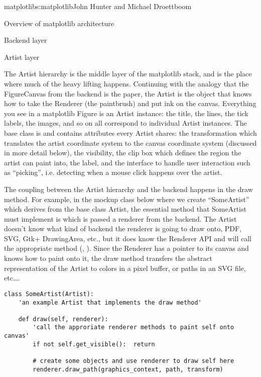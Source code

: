 \begin{aosachapter}{matplotlib}{s:matplotlib}{John Hunter and Michael Droettboom}
\begin{aosasect1}{Overview of matplotlib architecture}
\begin{aosasect2}{Backend layer}
\end{aosasect2}

\begin{aosasect2}{Artist layer}

The Artist hierarchy is the middle layer of the matplotlib stack, and
is the place where much of the heavy lifting happens.  Continuing with
the analogy that the FigureCanvas from the backend is the paper, the
Artist is the object that knows how to take the Renderer (the
paintbrush) and put ink on the canvas.  Everything you see in a
matplotlib Figure is an Artist instance: the title, the lines, the
tick labels, the images, and so on all correspond to individual Artist
instances.  The base class is  and
contains attributes every Artist shares: the transformation which
translates the artist coordinate system to the canvas coordinate
system (discussed in more detail below), the visibility, the clip box
which defines the region the artist can paint into, the label, and the
interface to handle user interaction such as ``picking'', i.e. detecting
when a mouse click happens over the artist.

The coupling between the Artist hierarchy and the backend happens in
the draw method.  For example, in the mockup class below where we
create ``SomeArtist'' which derives from the base class Artist, the
essential method that SomeArtist must implement is  which
is passed a renderer from the backend.  The Artist doesn't know what
kind of backend the renderer is going to draw onto, PDF, SVG, Gtk+
DrawingArea, etc., but it does know the Renderer API and will call the
appropriate method (, ).  Since the
Renderer has a pointer to its canvas and knows how to paint onto it,
the draw method transfers the abstract representation of the Artist to
colors in a pixel buffer, or paths in an SVG file, etc\dots{}.

\begin{verbatim}
class SomeArtist(Artist):
    'an example Artist that implements the draw method'

    def draw(self, renderer):
        'call the approriate renderer methods to paint self onto canvas'
        if not self.get_visible():  return

        # create some objects and use renderer to draw self here
        renderer.draw_path(graphics_context, path, transform)

\end{verbatim}


\end{aosasect2}
\end{aosasect1}
\end{aosachapter}

